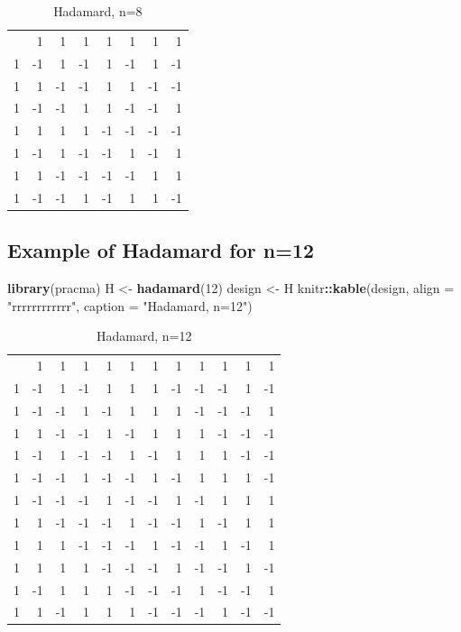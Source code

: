 \documentclass[
  12pt,
  a4paper,
]{article}
\newenvironment{Shaded}{\begin{snugshade}}{\end{snugshade}}
\newcommand{\AttributeTok}[1]{\textcolor[rgb]{0.13,0.29,0.53}{#1}}
\newcommand{\DecValTok}[1]{\textcolor[rgb]{0.00,0.00,0.81}{#1}}
\newcommand{\FunctionTok}[1]{\textcolor[rgb]{0.13,0.29,0.53}{\textbf{#1}}}
\newcommand{\NormalTok}[1]{#1}
\newcommand{\OtherTok}[1]{\textcolor[rgb]{0.56,0.35,0.01}{#1}}
\newcommand{\SpecialCharTok}[1]{\textcolor[rgb]{0.81,0.36,0.00}{\textbf{#1}}}
\newcommand{\StringTok}[1]{\textcolor[rgb]{0.31,0.60,0.02}{#1}}
\numberwithin{equation}{section}
\theoremstyle{plain}
\theoremstyle{definition}
\theoremstyle{remark}
\theoremstyle{note}
\begin{document}
\begin{longtable}[]{@{}rrrrrrrr@{}}
\caption{Hadamard, n=8}\tabularnewline
\toprule\noalign{}
\endfirsthead
\endhead
\bottomrule\noalign{}
\endlastfoot
1 & 1 & 1 & 1 & 1 & 1 & 1 & 1 \\
1 & -1 & 1 & -1 & 1 & -1 & 1 & -1 \\
1 & 1 & -1 & -1 & 1 & 1 & -1 & -1 \\
1 & -1 & -1 & 1 & 1 & -1 & -1 & 1 \\
1 & 1 & 1 & 1 & -1 & -1 & -1 & -1 \\
1 & -1 & 1 & -1 & -1 & 1 & -1 & 1 \\
1 & 1 & -1 & -1 & -1 & -1 & 1 & 1 \\
1 & -1 & -1 & 1 & -1 & 1 & 1 & -1 \\
\end{longtable}

\hypertarget{example-of-hadamard-for-n12}{%
\subsection{Example of Hadamard for
n=12}\label{example-of-hadamard-for-n12}}

\begin{Shaded}
\begin{Highlighting}[]
\FunctionTok{library}\NormalTok{(pracma)}
\NormalTok{H }\OtherTok{\textless{}{-}} \FunctionTok{hadamard}\NormalTok{(}\DecValTok{12}\NormalTok{)}
\NormalTok{design }\OtherTok{\textless{}{-}}\NormalTok{ H}
\NormalTok{knitr}\SpecialCharTok{::}\FunctionTok{kable}\NormalTok{(design, }\AttributeTok{align =} \StringTok{"rrrrrrrrrrrr"}\NormalTok{, }\AttributeTok{caption =} \StringTok{"Hadamard, n=12"}\NormalTok{)}
\end{Highlighting}
\end{Shaded}

\begin{longtable}[]{@{}rrrrrrrrrrrr@{}}
\caption{Hadamard, n=12}\tabularnewline
\toprule\noalign{}
\endfirsthead
\endhead
\bottomrule\noalign{}
\endlastfoot
1 & 1 & 1 & 1 & 1 & 1 & 1 & 1 & 1 & 1 & 1 & 1 \\
1 & -1 & 1 & -1 & 1 & 1 & 1 & -1 & -1 & -1 & 1 & -1 \\
1 & -1 & -1 & 1 & -1 & 1 & 1 & 1 & -1 & -1 & -1 & 1 \\
1 & 1 & -1 & -1 & 1 & -1 & 1 & 1 & 1 & -1 & -1 & -1 \\
1 & -1 & 1 & -1 & -1 & 1 & -1 & 1 & 1 & 1 & -1 & -1 \\
1 & -1 & -1 & 1 & -1 & -1 & 1 & -1 & 1 & 1 & 1 & -1 \\
1 & -1 & -1 & -1 & 1 & -1 & -1 & 1 & -1 & 1 & 1 & 1 \\
1 & 1 & -1 & -1 & -1 & 1 & -1 & -1 & 1 & -1 & 1 & 1 \\
1 & 1 & 1 & -1 & -1 & -1 & 1 & -1 & -1 & 1 & -1 & 1 \\
1 & 1 & 1 & 1 & -1 & -1 & -1 & 1 & -1 & -1 & 1 & -1 \\
1 & -1 & 1 & 1 & 1 & -1 & -1 & -1 & 1 & -1 & -1 & 1 \\
1 & 1 & -1 & 1 & 1 & 1 & -1 & -1 & -1 & 1 & -1 & -1 \\
\end{longtable}
\end{document}
